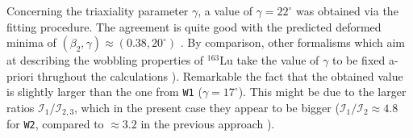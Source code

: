 \documentclass[myclassdoc,debug]{rjparticle}
\begin{document}
Concerning the triaxiality parameter $\gamma$, a value of $\gamma=22^\circ$ was obtained via the fitting procedure. The agreement is quite good with the predicted deformed minima of $(\beta_2,\gamma)\approx(0.38,20^\circ)$ \cite{jensen2002wobbling,jensen2004coexisting}. By comparison, other formalisms which aim at describing the wobbling properties of $^{163}$Lu take the value of $\gamma$ to be fixed a-priori thrughout the calculations \cite{tanabe2006algebraic,tanabe2017stability}). Remarkable the fact that the obtained value is slightly larger than the one from \texttt{W1} ($\gamma=17^\circ$). This might be due to the larger ratios $\mathcal{I}_1/\mathcal{I}_{2,3}$, which in the present case they appear to be bigger ($\mathcal{I}_1/\mathcal{I}_{2}\approx4.8$ for \texttt{W2}, compared to $\approx3.2$ in the previous approach ).
\end{document}
